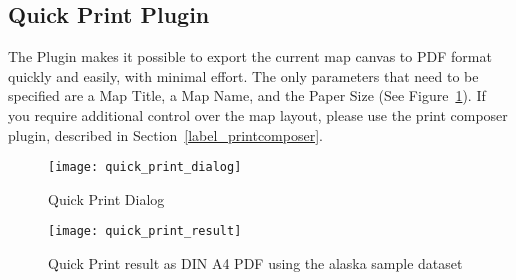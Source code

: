
\subsection{Quick Print Plugin}\label{quickprint}


The  Plugin makes it possible to export the current 
map canvas to PDF format quickly and easily, with minimal effort. The only parameters that 
need to be specified are a Map Title, a Map Name, and the Paper Size (See Figure~\ref{fig:quickprint}). 
If you require additional control over the map layout, 
please use the print composer plugin, described in Section~\ref{label_printcomposer}.  

\begin{figure}[ht]
   \begin{center}
   \caption{Quick Print Dialog \nixcaption}\label{fig:quickprint}\smallskip
   \texttt{[image: quick\_print\_dialog]}
\end{center}
\end{figure}

\begin{figure}[ht]
   \begin{center}
   \caption{Quick Print result as DIN A4 PDF using the alaska sample dataset\nixcaption}\label{fig:quickprint_result}\smallskip
   \texttt{[image: quick\_print\_result]}
\end{center}
\end{figure}

